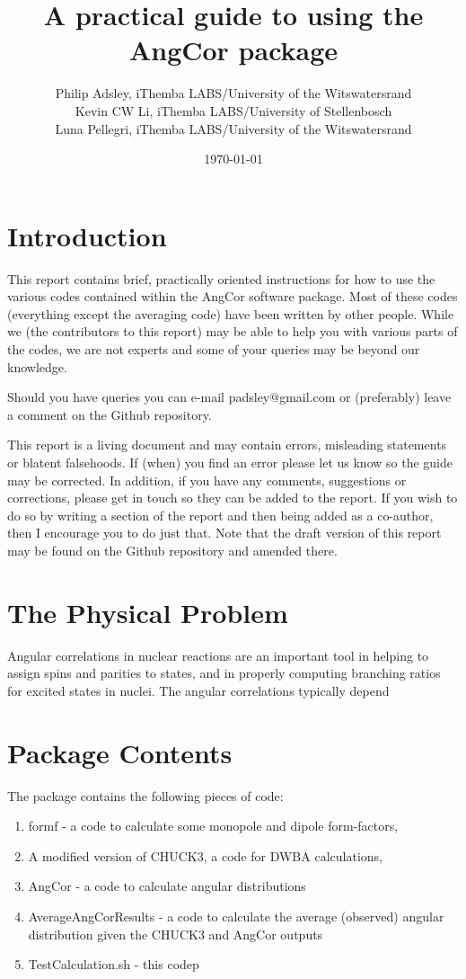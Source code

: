 \documentclass[a4paper,10pt]{article}
\title{A practical guide to using the AngCor package}
\author{Philip Adsley, iThemba LABS/University of the Witswatersrand\\
Kevin CW Li, iThemba LABS/University of Stellenbosch\\
Luna Pellegri, iThemba LABS/University of the Witswatersrand}
\date{\today}
\begin{document}
\lstset{language=bash}
\maketitle

\section{Introduction}

This report contains brief, practically oriented instructions for how to use the various codes contained within the AngCor software package. Most of these codes (everything except the averaging code) have been written by other people. While we (the contributors to this report) may be able to help you with various parts of the codes, we are not experts and some of your queries may be beyond our knowledge.

Should you have queries you can e-mail padsley@gmail.com or (preferably) leave a comment on the Github repository.

This report is a living document and may contain errors, misleading statements or blatent falsehoods. If (when) you find an error please let us know so the guide may be corrected. In addition, if you have any comments, suggestions or corrections, please get in touch so they can be added to the report. If you wish to do so by writing a section of the report and then being added as a co-author, then I encourage you to do just that. Note that the draft version of this report may be found on the Github repository and amended there.

\section{The Physical Problem}

Angular correlations in nuclear reactions are an important tool in helping to assign spins and parities to states, and in properly computing branching ratios for excited states in nuclei. The angular correlations typically depend 

\section{Package Contents}

The package contains the following pieces of code:

\begin{enumerate}
 \item formf - a code to calculate some monopole and dipole form-factors,
 \item A modified version of CHUCK3, a code for DWBA calculations,
 \item AngCor - a code to calculate angular distributions
 \item AverageAngCorResults - a code to calculate the average (observed) angular distribution given the CHUCK3 and AngCor outputs
 \item TestCalculation.sh - this codep
\end{enumerate}
\end{document}
